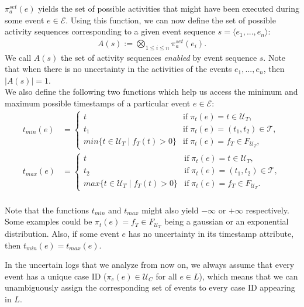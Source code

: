 $\pi_a^{set}(e)$ yields the set of possible activities that might have been executed during some event $e \in \mathcal{E}$.
Using this function, we can now define the set of possible activity sequences corresponding to a given event sequence $s = \langle e_1,...,e_n \rangle$:
\label{def: cartesian activities}
\begin{align*} 
A(s) := \bigotimes_{1 \leq i \leq n} \pi^{set}_a(e_i). 
\end{align*}
We call $A(s)$ the set of activity sequences \textit{enabled} by event sequence $s$.
Note that when there is no uncertainty in the activities of the events $e_1,...,e_n$, then $|A(s)|=1$.\\
We also define the following two functions which help us access the minimum and maximum possible timestamps of a particular event $e \in \mathcal{E}$:
\begin{align*}
t_{min}(e) &= \begin{cases}
	t & \mbox{if} \; \pi_t(e)=t \in \mathcal{U}_T,\\
	t_1 & \mbox{if} \; \pi_t(e)=(t_1,t_2) \in \mathcal{T}, \\
	min \{t \in \mathcal{U}_T \mid f_T(t) > 0 \} & \mbox{if} \; \pi_t(e) = f_T \in F_{\mathcal{U}_T},
	\end{cases} \\
t_{max}(e) &= \begin{cases}
	t & \mbox{if} \; \pi_t(e)=t \in \mathcal{U}_T,\\
	t_2 & \mbox{if} \; \pi_t(e)=(t_1,t_2) \in \mathcal{T}, \\
	max \{t \in \mathcal{U}_T \mid f_T(t) > 0 \} & \mbox{if} \; \pi_t(e) = f_T \in F_{\mathcal{U}_T}.
	\end{cases} \\
\end{align*}

Note that the functions $t_{min}$ and $t_{max}$ might also yield $- \infty$ or $+\infty$ respectively. 
Some examples could be $\pi_t(e)=f_T \in F_{\mathcal{U}_T}$ being a gaussian or an exponential distribution.
Also, if some event $e$ has no uncertainty in its timestamp attribute, then $t_{min}(e) = t_{max}(e)$.

In the uncertain logs that we analyze from now on, we always assume that every event has a unique case ID ($\pi_c(e) \in \mathcal{U}_C$ for all $e \in L$), which means that we can unambiguously assign the corresponding set of events to every case ID appearing in $L$.

